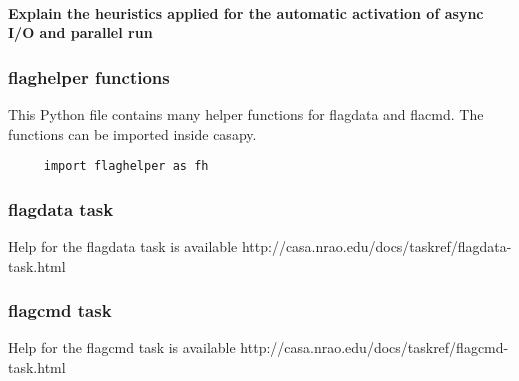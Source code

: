 \paragraph{Explain the heuristics applied for the automatic activation of async
I/O and parallel run}

\subsubsection{flaghelper functions}

This Python file contains many helper functions for flagdata and flacmd. The
functions can be imported inside casapy.

\begin{verbatim}
     import flaghelper as fh
\end{verbatim}

\subsubsection{flagdata task}
Help for the flagdata task is available 
{http://casa.nrao.edu/docs/taskref/flagdata-task.html}

\subsubsection{flagcmd task}
Help for the flagcmd task is available 
{http://casa.nrao.edu/docs/taskref/flagcmd-task.html}




